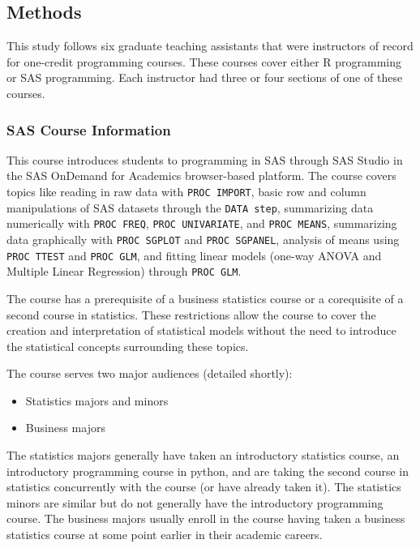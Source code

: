 \documentclass[
  letterpaper,
  DIV=11,
  numbers=noendperiod]{scrartcl}
\providecommand{\tightlist}{%
  \setlength{\itemsep}{0pt}\setlength{\parskip}{0pt}}\usepackage{longtable,booktabs,array}
\begin{document}
\hypertarget{methods}{%
\subsection{Methods}\label{methods}}

This study follows six graduate teaching assistants that were
instructors of record for one-credit programming courses. These courses
cover either R programming or SAS programming. Each instructor had three
or four sections of one of these courses.

\hypertarget{sas-course-information}{%
\subsubsection{SAS Course Information}\label{sas-course-information}}

This course introduces students to programming in SAS through SAS Studio
in the SAS OnDemand for Academics browser-based platform. The course
covers topics like reading in raw data with \texttt{PROC\ IMPORT}, basic
row and column manipulations of SAS datasets through the
\texttt{DATA\ step}, summarizing data numerically with
\texttt{PROC\ FREQ}, \texttt{PROC\ UNIVARIATE}, and
\texttt{PROC\ MEANS}, summarizing data graphically with
\texttt{PROC\ SGPLOT} and \texttt{PROC\ SGPANEL}, analysis of means
using \texttt{PROC\ TTEST} and \texttt{PROC\ GLM}, and fitting linear
models (one-way ANOVA and Multiple Linear Regression) through
\texttt{PROC\ GLM}.

The course has a prerequisite of a business statistics course or a
corequisite of a second course in statistics. These restrictions allow
the course to cover the creation and interpretation of statistical
models without the need to introduce the statistical concepts
surrounding these topics.

The course serves two major audiences (detailed shortly):

\begin{itemize}
\tightlist
\item
  Statistics majors and minors
\item
  Business majors
\end{itemize}

The statistics majors generally have taken an introductory statistics
course, an introductory programming course in python, and are taking the
second course in statistics concurrently with the course (or have
already taken it). The statistics minors are similar but do not
generally have the introductory programming course. The business majors
usually enroll in the course having taken a business statistics course
at some point earlier in their academic careers.
\end{document}
